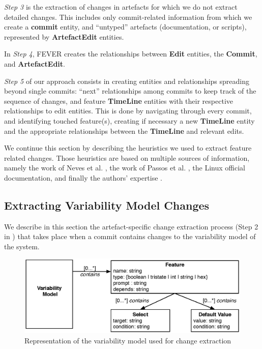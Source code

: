 \textit{Step 3} is the extraction of changes in artefacts for which we do not extract detailed changes.
This includes only commit-related information from which we create a \textbf{commit} entity, 
and ``untyped'' artefacts (\ie documentation, or scripts), represented by \textbf{ArtefactEdit} entities.

In \textit{Step 4}, FEVER creates the relationships between \textbf{Edit} entities, the \textbf{Commit}, and \textbf{ArtefactEdit}.

\textit{Step 5} of our approach consists in creating entities and relationships spreading beyond single commits:
``next'' relationships among commits to keep track of the sequence of changes, and feature \textbf{TimeLine} entities 
with their respective relationships to edit entities.
This is done by navigating through every commit, and identifying touched feature(s), 
creating if necessary a new \textbf{TimeLine} entity and the appropriate relationships between 
the \textbf{TimeLine} and relevant edits.

We continue this section by describing the heuristics we used to extract feature related changes. 
Those heuristics are based on multiple sources of information, namely the work of Neves et al. \citep{neves_safe_2015}, the work of Passos et al. \citep{passos_coevolution_2015}, 
the Linux official documentation,  and finally the authors' expertise \citep{passos_coevolution_2015,dintzner_analysing_2015}.


\subsection{Extracting Variability Model Changes}
\label{sec:vm_model}

We describe in this section the artefact-specific change extraction process (Step 2 in )
that takes place when a commit contains changes to the variability model of the system.
\begin{figure}[h]
	\centering
	\includegraphics[scale=0.40]{EMF_VM_Model.eps}
	\caption{Representation of the variability model used for change extraction}
	\label{fig:vm_for_diff}
\end{figure}

